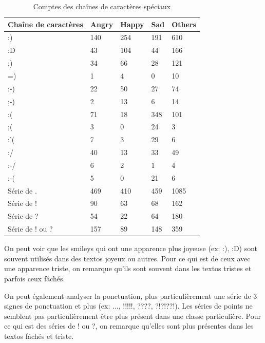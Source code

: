 \begin{longtable}[c]{@{}lllll@{}}
	\caption{Comptes des chaînes de caractères spéciaux}
	\label{table:binettes}\\
	\toprule
	Chaîne de caractères & Angry & Happy & Sad & Others \\* \midrule
	\endhead
	\bottomrule
	\endfoot
	\endlastfoot
	:)                   & 140   & 254   & 191 & 610    \\
	:D                   & 43    & 104   & 44  & 166    \\
	;)                   & 34    & 66    & 28  & 121    \\
	=)                   & 1     & 4     & 0   & 10     \\
	:-)                  & 22    & 50    & 27  & 74     \\
	;-)                  & 2     & 13    & 6   & 14     \\
	:(                   & 71    & 18    & 348 & 101    \\
	;(                   & 3     & 0     & 24  & 3      \\
	:'(                  & 7     & 3     & 29  & 6      \\
	:/                   & 40    & 13    & 33  & 49     \\
	:-/                  & 6     & 2     & 1   & 4      \\
	:-(                  & 5     & 0     & 21  & 6      \\
	Série de .           & 469   & 410   & 459 & 1085   \\
	Série de !           & 90    & 63    & 68  & 162    \\
	Série de ?           & 54    & 22    & 64  & 180    \\
	Série de ! ou ?      & 157   & 89    & 148 & 359    \\* \bottomrule
\end{longtable}

On peut voir que les smileys qui ont une apparence plus joyeuse (ex: :), :D) sont souvent utilisés dans des textos joyeux ou autres. Pour ce qui est de ceux avec une apparence triste, on remarque qu'ils sont souvent dans les textos tristes et parfois ceux fâchés.

On peut également analyser la ponctuation, plus particulièrement une série de 3 signes de ponctuation et plus (ex: ..., !!!!!, ????, ?!?!??!). Les séries de points ne semblent pas particulièrement être plus présent dans une classe particulière. Pour ce qui est des séries de ! ou ?, on remarque qu'elles sont plus présentes dans les textos fâchés et triste.

